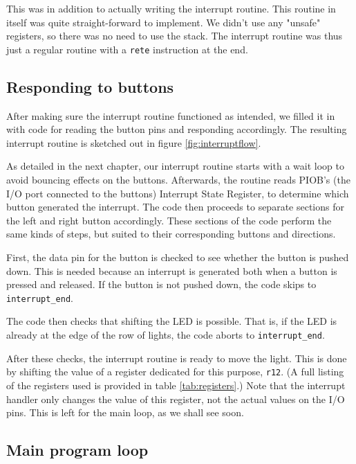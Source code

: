 This was in addition to actually writing the interrupt routine. This
routine in itself was quite straight-forward to implement. We didn't use
any "unsafe" registers, so there was no need to use the stack. The
interrupt routine was thus just a regular routine with a \texttt{rete}
instruction at the end.

\subsection{Responding to buttons}

After making sure the interrupt routine functioned as intended, we
filled it in with code for reading the button pins and responding
accordingly. The resulting interrupt routine is sketched out in figure
\ref{fig:interruptflow}.



As detailed in the next chapter, our interrupt routine starts with a
wait loop to avoid bouncing effects on the buttons. Afterwards, the
routine reads PIOB's (the I/O port connected to the buttons) Interrupt
State Register, to determine which button generated the interrupt. The
code then proceeds to separate sections for the left and right button
accordingly. These sections of the code perform the same kinds of steps,
but suited to their corresponding buttons and directions.

First, the data pin for the button is checked to see whether the button
is pushed down. This is needed because an interrupt is generated both
when a button is pressed and released. If the button is not pushed down,
the code skips to \texttt{interrupt\_end}.

The code then checks that shifting the LED is possible. That is, if the
LED is already at the edge of the row of lights, the code aborts to
\texttt{interrupt\_end}.

After these checks, the interrupt routine is ready to move the light.
This is done by shifting the value of a register dedicated for this
purpose, \texttt{r12}. (A full listing of the registers used is provided
in table \ref{tab:registers}.) Note that the interrupt handler only
changes the value of this register, not the actual values on the I/O
pins. This is left for the main loop, as we shall see soon.



\subsection{Main program loop}


